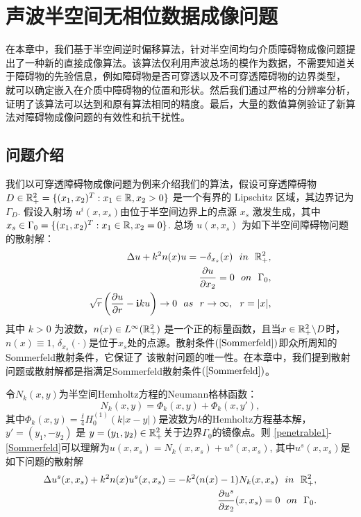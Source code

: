 
\chapter{声波半空间无相位数据成像问题}

在本章中，我们基于半空间逆时偏移算法，针对半空间均匀介质障碍物成像问题提出了一种新的直接成像算法。该算法仅利用声波总场的模作为数据，不需要知道关于障碍物的先验信息，例如障碍物是否可穿透以及不可穿透障碍物的边界类型， 就可以确定嵌入在介质中障碍物的位置和形状。然后我们通过严格的分辨率分析，证明了该算法可以达到和原有算法相同的精度。最后，大量的数值算例验证了新算法对障碍物成像问题的有效性和抗干扰性。
\section{问题介绍}
我们以可穿透障碍物成像问题为例来介绍我们的算法，假设可穿透障碍物 $D\in\mathbb{R}^2_+=\{(x_1,x_2)^T:x_1\in\mathbb{R},x_2>0\}$ 是一个有界的
Lipschitz 区域，其边界记为 $\Gamma_D$. 假设入射场 $u^i(x,x_s)$由位于半空间边界上的点源 $x_s$ 激发生成，其中 $x_s\in\Gamma_0=\{(x_1,x_2)^T:x_1\in\mathbb{R},x_2=0\}$. 总场 $u(x,x_s)$ 为如下半空间障碍物问题的散射解：
\begin{eqnarray}
 \Delta u+k^2n(x)u=-\delta_{x_s}(x)\ \ in\ \ \R^2_+,\label{penetrable1}\\
 \frac{\partial u}{\partial x_2}=0\ \ on\ \ \Gamma_0,\\
 \sqrt{r}\left(\frac{\partial u}{\partial r}-\ii ku\right)\rightarrow0\ \ as\ \ r\rightarrow\infty,\ \ r=|x|,\label{Sommerfeld}
\end{eqnarray}
其中 $k>0$ 为波数，$n(x)\in L^{\infty}(\mathbb{R}^2_+)$ 是一个正的标量函数，且当$x\in\mathbb{R}^2_+\backslash D$时，$n(x)\equiv1$,
$\delta_{x_s}(\cdot)$是位于$x_s$处的点源。散射条件$(\ref{Sommerfeld})$即众所周知的Sommerfeld散射条件，它保证了
该散射问题的唯一性。在本章中，我们提到散射问题或散射解都是指满足Sommerfeld散射条件$(\ref{Sommerfeld})$。

令$N_k(x,y)$为半空间Hemholtz方程的Neumann格林函数：
\begin{equation}\label{Green}
  N_k(x,y)=\Phi_k(x,y)+\Phi_k(x,y'),
\end{equation}
其中$\Phi_k(x,y)=\frac{\ii}{4}H_0^{(1)}(k|x-y|)$是波数为$k$的Hemholtz方程基本解，$y'=(y_1,-y_2)$ 是 $y=(y_1,y_2)\in\mathbb{R}^2_+$关于边界$\Gamma_0$的镜像点。则
\eqref{penetrable1}-\eqref{Sommerfeld}可以理解为$u(x,x_s)=N_k(x,x_s)+u^s(x,x_s)$, 其中$u^s(x,x_s)$是如下问题的散射解
\begin{eqnarray}
  \Delta u^s(x,x_s)+k^2n(x)u^s(x,x_s)=-k^2(n(x)-1)N_k(x,x_s)\ \ in\ \ \R^2_+,\label{equ1}\\
  \frac{\partial u^s}{\partial x_2}(x,x_s)=0\ \ on\ \ \Gamma_0\label{equ2}.
\end{eqnarray}

